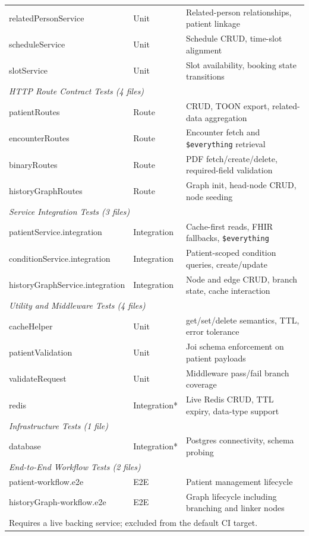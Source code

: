 \begin{table}[H]
\begin{tabular}{|p{5.5cm}|p{2.2cm}|p{6cm}|}
relatedPersonService      & Unit & Related-person relationships, patient linkage \\
scheduleService           & Unit & Schedule CRUD, time-slot alignment \\
slotService               & Unit & Slot availability, booking state transitions \\
\hline
\multicolumn{3}{|l|}{\textit{HTTP Route Contract Tests (4 files)}} \\ \hline
patientRoutes             & Route & CRUD, TOON export, related-data aggregation \\
encounterRoutes           & Route & Encounter fetch and \texttt{\$everything} retrieval \\
binaryRoutes              & Route & PDF fetch/create/delete, required-field validation \\
historyGraphRoutes        & Route & Graph init, head-node CRUD, node seeding \\
\hline
\multicolumn{3}{|l|}{\textit{Service Integration Tests (3 files)}} \\ \hline
patientService.integration      & Integration & Cache-first reads, FHIR fallbacks, \texttt{\$everything} \\
conditionService.integration    & Integration & Patient-scoped condition queries, create/update \\
historyGraphService.integration & Integration & Node and edge CRUD, branch state, cache interaction \\
\hline
\multicolumn{3}{|l|}{\textit{Utility and Middleware Tests (4 files)}} \\ \hline
cacheHelper               & Unit & get/set/delete semantics, TTL, error tolerance \\
patientValidation         & Unit & Joi schema enforcement on patient payloads \\
validateRequest           & Unit & Middleware pass/fail branch coverage \\
redis                     & Integration* & Live Redis CRUD, TTL expiry, data-type support \\
\hline
\multicolumn{3}{|l|}{\textit{Infrastructure Tests (1 file)}} \\ \hline
database                  & Integration* & Postgres connectivity, schema probing \\
\hline
\multicolumn{3}{|l|}{\textit{End-to-End Workflow Tests (2 files)}} \\ \hline
patient-workflow.e2e      & E2E & Patient management lifecycle \\
historyGraph-workflow.e2e & E2E & Graph lifecycle including branching and linker nodes \\
\hline
\multicolumn{3}{l}{\footnotesize * Requires a live backing service; excluded from the default CI target.}
\end{tabular}
\end{table}

